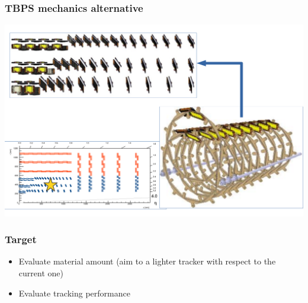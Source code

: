 \documentclass[pdftex, 11pt]{beamer}
\begin{document}
\begin{frame}
  \frametitle{TBPS mechanics  alternative}
  \begin{center}
    \includegraphics[width=\textwidth]{img/mechanics4.pdf}
  \end{center}
\end{frame}

\begin{frame}
  \frametitle{Target}
  \begin{itemize}
  \item Evaluate \alert{material} amount (aim to a lighter tracker with respect to the current one)
    \pause
  \item Evaluate tracking \alert{performance}
  \end{itemize}
\end{frame}
\end{document}
